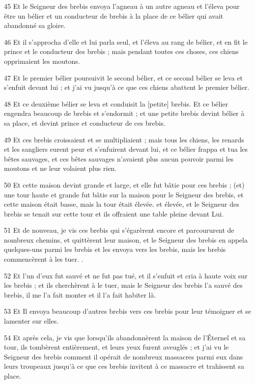 \par 45 Et le Seigneur des brebis envoya l'agneau à un autre agneau et l'éleva pour être un bélier et un conducteur de brebis à la place de ce bélier qui avait abandonné sa gloire.
\par 46 Et il s'approcha d'elle et lui parla seul, et l'éleva au rang de bélier, et en fit le prince et le conducteur des brebis ; mais pendant toutes ces choses, ces chiens opprimaient les moutons.
\par 47 Et le premier bélier poursuivit le second bélier, et ce second bélier se leva et s'enfuit devant lui ; et j'ai vu jusqu'à ce que ces chiens abattent le premier bélier.
\par 48 Et ce deuxième bélier se leva et conduisit la [petite] brebis. Et ce bélier engendra beaucoup de brebis et s'endormit ; et une petite brebis devint bélier à sa place, et devint prince et conducteur de ces brebis.
\par 49 Et ces brebis croissaient et se multipliaient ; mais tous les chiens, les renards et les sangliers eurent peur et s'enfuirent devant lui, et ce bélier frappa et tua les bêtes sauvages, et ces bêtes sauvages n'avaient plus aucun pouvoir parmi les moutons et ne leur volaient plus rien.
\par 50 Et cette maison devint grande et large, et elle fut bâtie pour ces brebis ; (et) une tour haute et grande fut bâtie sur la maison pour le Seigneur des brebis, et cette maison était basse, mais la tour était élevée. et élevée, et le Seigneur des brebis se tenait sur cette tour et ils offraient une table pleine devant Lui.
\par 51 Et de nouveau, je vis ces brebis qui s'égarèrent encore et parcoururent de nombreux chemins, et quittèrent leur maison, et le Seigneur des brebis en appela quelques-uns parmi les brebis et les envoya vers les brebis, mais les brebis commencèrent à les tuer. .
\par 52 Et l'un d'eux fut sauvé et ne fut pas tué, et il s'enfuit et cria à haute voix sur les brebis ; et ils cherchèrent à le tuer, mais le Seigneur des brebis l'a sauvé des brebis, il me l'a fait monter et il l'a fait habiter là.
\par 53 Et Il envoya beaucoup d'autres brebis vers ces brebis pour leur témoigner et se lamenter sur elles.
\par 54 Et après cela, je vis que lorsqu'ils abandonnèrent la maison de l'Éternel et sa tour, ils tombèrent entièrement, et leurs yeux furent aveuglés ; et j'ai vu le Seigneur des brebis comment il opérait de nombreux massacres parmi eux dans leurs troupeaux jusqu'à ce que ces brebis invitent à ce massacre et trahissent sa place.

